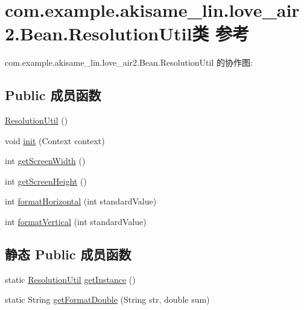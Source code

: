 \hypertarget{classcom_1_1example_1_1akisame__lin_1_1love__air2_1_1_bean_1_1_resolution_util}{}\section{com.\+example.\+akisame\+\_\+lin.\+love\+\_\+air2.\+Bean.\+Resolution\+Util类 参考}
\label{classcom_1_1example_1_1akisame__lin_1_1love__air2_1_1_bean_1_1_resolution_util}


com.\+example.\+akisame\+\_\+lin.\+love\+\_\+air2.\+Bean.\+Resolution\+Util 的协作图\+:
\subsection*{Public 成员函数}
\begin{DoxyCompactItemize}
\item 
\mbox{\hyperlink{classcom_1_1example_1_1akisame__lin_1_1love__air2_1_1_bean_1_1_resolution_util_ad8f484946ae5a4c35a9a8a38fdfc34f3}{Resolution\+Util}} ()
\item 
void \mbox{\hyperlink{classcom_1_1example_1_1akisame__lin_1_1love__air2_1_1_bean_1_1_resolution_util_a9972c1bec5a6442a9cbb2f52887d338c}{init}} (Context context)
\item 
int \mbox{\hyperlink{classcom_1_1example_1_1akisame__lin_1_1love__air2_1_1_bean_1_1_resolution_util_af83b3f414284c552e29a3f670a79cda6}{get\+Screen\+Width}} ()
\item 
int \mbox{\hyperlink{classcom_1_1example_1_1akisame__lin_1_1love__air2_1_1_bean_1_1_resolution_util_ac95b29e0dfcc91738d143a25fb551150}{get\+Screen\+Height}} ()
\item 
int \mbox{\hyperlink{classcom_1_1example_1_1akisame__lin_1_1love__air2_1_1_bean_1_1_resolution_util_ab2ddc2591d48387770e2850271204c6d}{format\+Horizontal}} (int standard\+Value)
\item 
int \mbox{\hyperlink{classcom_1_1example_1_1akisame__lin_1_1love__air2_1_1_bean_1_1_resolution_util_a3edaf584f812d38230497a36cf4d2011}{format\+Vertical}} (int standard\+Value)
\end{DoxyCompactItemize}
\subsection*{静态 Public 成员函数}
\begin{DoxyCompactItemize}
\item 
static \mbox{\hyperlink{classcom_1_1example_1_1akisame__lin_1_1love__air2_1_1_bean_1_1_resolution_util}{Resolution\+Util}} \mbox{\hyperlink{classcom_1_1example_1_1akisame__lin_1_1love__air2_1_1_bean_1_1_resolution_util_af79e21c2ab2c0f5ad9bfa7ab16dce0d7}{get\+Instance}} ()
\item 
static String \mbox{\hyperlink{classcom_1_1example_1_1akisame__lin_1_1love__air2_1_1_bean_1_1_resolution_util_af2217a6e99bede6b2d78967f85711274}{get\+Format\+Double}} (String str, double sum)
\end{DoxyCompactItemize}

